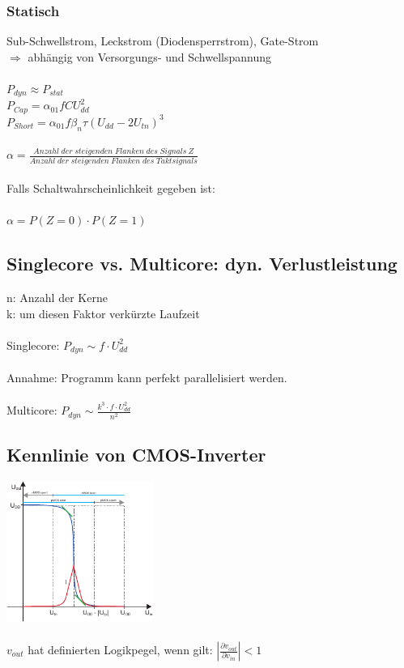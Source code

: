 \documentclass[a4paper,twocolumn,10pt]{article}
\begin{document}
\subsubsection*{Statisch}
Sub-Schwellstrom, Leckstrom (Diodensperrstrom), Gate-Strom \\
 $\Rightarrow$ abhängig von Versorgungs- und Schwellspannung\\\\
 $P_{dyn} \approx P_{stat}$\\
$P_{Cap}=\alpha_{01}fCU_{dd}^2$\\
$P_{Short}=\alpha_{01}f\beta_n\tau(U_{dd}-2U_{tn})^3$\\\\
$\alpha = \frac{Anzahl\; der\; steigenden\; Flanken\; des\; Signals\ Z}{Anzahl\; der\; steigenden\; Flanken\; des\; Taktsignals}$\\\\
Falls Schaltwahrscheinlichkeit gegeben ist:\\\\
$\alpha = P(Z=0)\cdot P(Z=1)$

\subsection*{Singlecore vs. Multicore: dyn. Verlustleistung}
n: Anzahl der Kerne\\
k: um diesen Faktor verkürzte Laufzeit\\\\
Singlecore: $P_{dyn} \sim f\cdot U_{dd}^2$\\\\
Annahme: Programm kann perfekt parallelisiert werden.\\\\
Multicore: $P_{dyn} \sim \frac{k^3\cdot f \cdot U_{dd}^2}{n^2}$

\subsection*{Kennlinie von CMOS-Inverter}
\includegraphics[width=0.36\textwidth]{Grafiken/Inverter_Kennlinie}\\\\
$v_{out}$ hat definierten Logikpegel, wenn gilt: $|\frac{\partial v_{out}}{\partial v_{in}}|<1$
\end{document}
